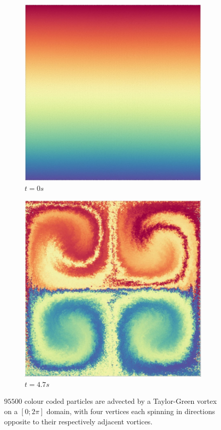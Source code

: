 \begin{figure}
  \centering
  \begin{subfigure}[t]{0.4\textwidth}
    \includegraphics[width=\textwidth]{images/density/taylorgreen_t0.jpg}
    \caption{$t=0s$}
  \end{subfigure}
  \begin{subfigure}[t]{0.4\textwidth}
    \includegraphics[width=\textwidth]{images/density/taylorgreen_t4_70.jpg}
    \caption{$t=4.7s$}
  \end{subfigure}
  \caption{$95 500$ colour coded particles are advected by a Taylor-Green vortex on a $[0;2\pi]$ domain, with four vertices each spinning in directions opposite to their respectively adjacent vortices.}
  \label{fig:taylor-green-vortex}
\end{figure}

